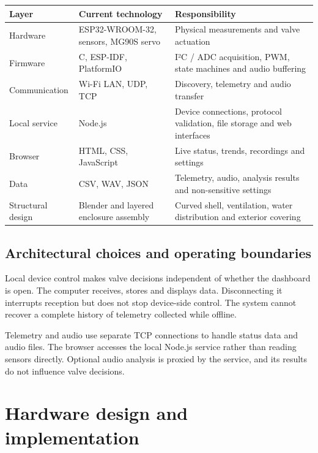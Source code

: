 \documentclass[10pt,a4paper]{article}
\begin{document}
\begin{longtable}{>{\raggedright\arraybackslash}p{42mm}>{\raggedright\arraybackslash}p{59mm}>{\raggedright\arraybackslash}p{58mm}}
\toprule
\textbf{Layer} & \textbf{Current technology} & \textbf{Responsibility}\\\midrule\endhead
Hardware & ESP32-WROOM-32, sensors, MG90S servo & Physical measurements and valve actuation\\
Firmware & C, ESP-IDF, PlatformIO & I²C / ADC acquisition, PWM, state machines and audio buffering\\
Communication & Wi-Fi LAN, UDP, TCP & Discovery, telemetry and audio transfer\\
Local service & Node.js & Device connections, protocol validation, file storage and web interfaces\\
Browser & HTML, CSS, JavaScript & Live status, trends, recordings and settings\\
Data & CSV, WAV, JSON & Telemetry, audio, analysis results and non-sensitive settings\\
Structural design & Blender and layered enclosure assembly & Curved shell, ventilation, water distribution and exterior covering\\
\bottomrule\end{longtable}

\subsection{Architectural choices and operating boundaries}

Local device control makes valve decisions independent of whether the dashboard is open. The computer receives, stores and displays data. Disconnecting it interrupts reception but does not stop device-side control. The system cannot recover a complete history of telemetry collected while offline.


Telemetry and audio use separate TCP connections to handle status data and audio files. The browser accesses the local Node.js service rather than reading sensors directly. Optional audio analysis is proxied by the service, and its results do not influence valve decisions.



\section{Hardware design and implementation}
\end{document}
